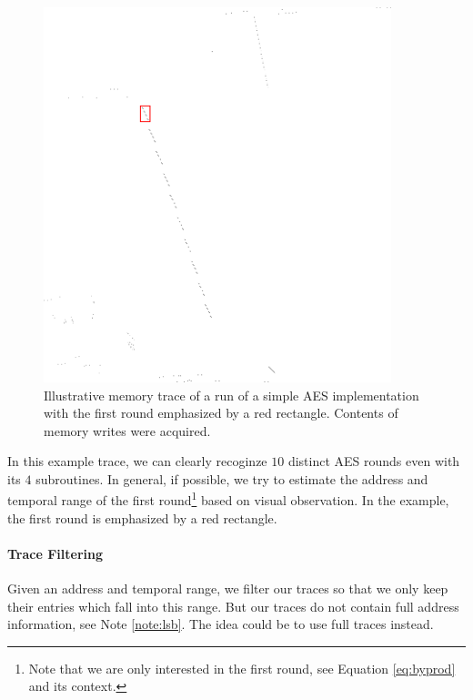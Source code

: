 		\begin{figure}[h!]
		\begin{center}
			\includegraphics[width=0.9\textwidth]{./figures/memtrace/memtrace_emph.png}
			\caption{Illustrative memory trace of a run of a simple AES implementation with the first round emphasized by a red rectangle. Contents of memory writes were acquired.}
			\label{fig:memtrace}
		\end{center}
		\end{figure}
		
		In this example trace, we can clearly recoginze $10$ distinct AES rounds even with its $4$ subroutines. In general, if possible, we try to estimate the address and temporal range of the first round\footnote{Note that we are only interested in the first round, see Equation \ref{eq:byprod} and its context.} based on visual observation. In the example, the first round is emphasized by a red rectangle.

	\paragraph{Trace Filtering}
		
		Given an address and temporal range, we filter our traces so that we only keep their entries which fall into this range. But our traces do not contain full address information, see Note \ref{note:lsb}. The idea could be to use full traces instead.
		
